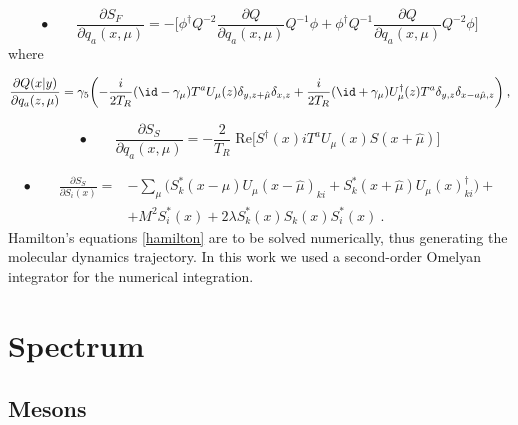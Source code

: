 \begin{equation}
\bullet \qquad\frac{\partial S_F}{\partial q_a(x,\mu)} =   -\biggl[ \phi^{\dagger} Q^{-2}\frac{\partial Q}{\partial q_a(x,\mu)} Q^{-1} \phi + \phi^{\dagger} Q^{-1} \frac{\partial Q}{\partial q_a(x,\mu)} Q^{-2} \phi \biggr] 
\end{equation}
%
where

\begin{equation}
\frac{\partial Q(x \vert y)}{\partial q_a(z,\mu)} = \gamma_5 \biggl( -\frac{i}{2T_R} (\id - \gamma_{\mu}) T^a U_{\mu}(z) \delta_{y,z+\hat\mu} \delta_{x,z} +\frac{i}{2T_R}(\id + \gamma_{\mu}) U_{\mu}^{\dagger}(z) T^a \delta_{y,z} \delta_{x-a\hat\mu,z} \biggr) \: ,
\end{equation}


\begin{equation}
\bullet \qquad
\frac{\partial S_S}{\partial q_a(x,\mu)} = - \frac{2}{T_R} \; \mathrm{Re} \biggl[ S^{\dagger}(x) i T^a U_{\mu}(x) S(x+\hat\mu) \biggr] 
\end{equation}



\begin{equation}
\begin{split}
\bullet \qquad
\frac{\partial S_S}{\partial S_i(x)} = & - \sum_{\mu} \biggl( S^*_k(x-\hat \mu) U_{\mu}(x-\hat\mu)_{ki} + S^*_k(x+\hat\mu) U_{\mu}(x)^{\dagger}_{ki} \biggr) +  \\
& + M^2 S_i^*(x) + 2 \lambda S_k^*(x) S_k(x) S_i^*(x) \: .
\end{split}
\end{equation}
%
Hamilton's equations \ref{hamilton} are to be solved numerically, thus generating the molecular dynamics trajectory. In this work we used a second-order Omelyan integrator \cite{PhysRevE.65.056706,OMELYAN2003272} for the numerical integration.




\section{Spectrum}


\subsection{Mesons}

